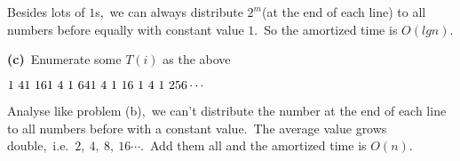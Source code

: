 \documentclass[]{article}
\begin{document}
     Besides lots of $1$s,\ we can always distribute $2^m$(at the end of each line) to all numbers before equally with constant value $1$.\ So the amortized time is $O(lgn)$.
     
     \textbf{(c)}\ Enumerate some $T(i)$ as the above
     
     $\\
      1\ 4\\
      1\ 16\\
      1\ 4\ 1\ 64\\
      1\ 4\ 1\ 16\ 1\ 4\ 1\ 256\\
      \cdots$ 
      
     Analyse like problem (b),\ we can't distribute the number at the end of each line to all numbers before with a constant value.\ The average value grows double,\ i.e.\ $2,\ 4,\ 8,\ 16\cdots$.\ Add them all and the amortized time is $O(n)$. 
\end{document}
